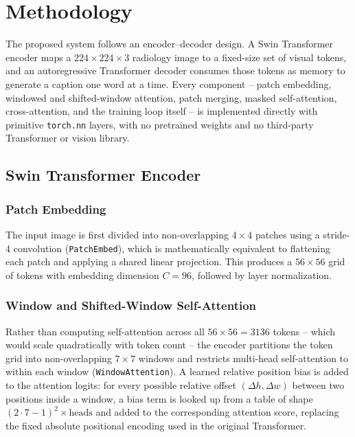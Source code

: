 %

\section{Methodology}
\label{sec:method}

The proposed system follows an encoder--decoder design. A Swin Transformer encoder maps a $224\times224\times3$ radiology image to a fixed-size set of visual tokens, and an autoregressive Transformer decoder consumes those tokens as memory to generate a caption one word at a time. Every component -- patch embedding, windowed and shifted-window attention, patch merging, masked self-attention, cross-attention, and the training loop itself -- is implemented directly with primitive \texttt{torch.nn} layers, with no pretrained weights and no third-party Transformer or vision library.

\subsection{Swin Transformer Encoder}
\label{sec:method-encoder}

\subsubsection{Patch Embedding}
The input image is first divided into non-overlapping $4\times4$ patches using a stride-4 convolution (\texttt{PatchEmbed}), which is mathematically equivalent to flattening each patch and applying a shared linear projection. This produces a $56\times56$ grid of tokens with embedding dimension $C=96$, followed by layer normalization.

\subsubsection{Window and Shifted-Window Self-Attention}
Rather than computing self-attention across all $56\times56=3136$ tokens -- which would scale quadratically with token count -- the encoder partitions the token grid into non-overlapping $7\times7$ windows and restricts multi-head self-attention to within each window (\texttt{WindowAttention}). A learned relative position bias is added to the attention logits: for every possible relative offset $(\Delta h, \Delta w)$ between two positions inside a window, a bias term is looked up from a table of shape $(2\cdot7-1)^2 \times \text{heads}$ and added to the corresponding attention score, replacing the fixed absolute positional encoding used in the original Transformer.

